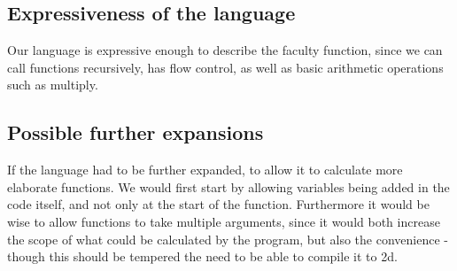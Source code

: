 \subsection{Expressiveness of the language}
Our language is expressive enough to describe the faculty function, since we can call functions recursively, has flow control, as well as basic arithmetic operations such as multiply. 


\subsection{Possible further expansions}
If the language had to be further expanded, to allow it to calculate
more elaborate functions. We would first start by allowing variables
being added in the code itself, and not only at the start of the
function. Furthermore it would be wise to allow functions to take
multiple arguments, since it would both increase the scope of what
could be calculated by the program, but also the convenience - though
this should be tempered the need to be able to compile it to 2d.\\
